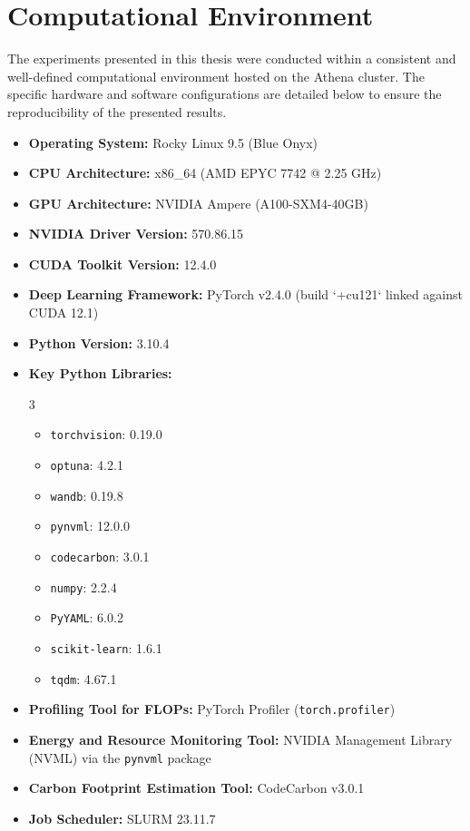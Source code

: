\documentclass[11pt, english]{article}
\newcommand{\code}[1]{\texttt{#1}}
\begin{document}
\pagebreak

\section{Computational Environment}
\label{app:environment}
The experiments presented in this thesis were conducted within a consistent and well-defined computational environment hosted on the Athena cluster. The specific hardware and software configurations are detailed below to ensure the reproducibility of the presented results.
\begin{itemize}
    \item \textbf{Operating System:} Rocky Linux 9.5 (Blue Onyx)
    \item \textbf{CPU Architecture:} x86\_64 (AMD EPYC 7742 @ 2.25 GHz)
    \item \textbf{GPU Architecture:} NVIDIA Ampere (A100-SXM4-40GB)
    \item \textbf{NVIDIA Driver Version:} 570.86.15
    \item \textbf{CUDA Toolkit Version:} 12.4.0
    \item \textbf{Deep Learning Framework:} PyTorch v2.4.0 (build `+cu121` linked against CUDA 12.1)
    \item \textbf{Python Version:} 3.10.4
    \item \textbf{Key Python Libraries:}
        \begin{multicols}{3}
            \begin{itemize}
                \item \code{torchvision}: 0.19.0
                \item \code{optuna}: 4.2.1
                \item \code{wandb}: 0.19.8
                \item \code{pynvml}: 12.0.0
                \item \code{codecarbon}: 3.0.1
                \item \code{numpy}: 2.2.4
                \item \code{PyYAML}: 6.0.2
                \item \code{scikit-learn}: 1.6.1
                \item \code{tqdm}: 4.67.1 
            \end{itemize}
        \end{multicols}
    \item \textbf{Profiling Tool for FLOPs:} PyTorch Profiler (\texttt{torch.profiler})
    \item \textbf{Energy and Resource Monitoring Tool:} NVIDIA Management Library (NVML) via the \code{pynvml} package
    \item \textbf{Carbon Footprint Estimation Tool:} CodeCarbon v3.0.1 \cite{codecarbon2021}
    \item \textbf{Job Scheduler:} SLURM 23.11.7
\end{itemize}
\end{document}
